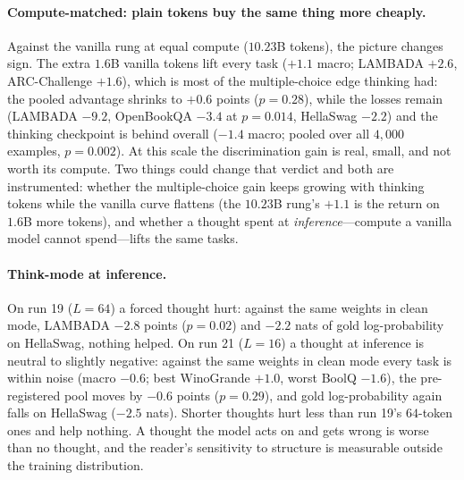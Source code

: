 \documentclass{article} %
\begin{document}
\paragraph{Compute-matched: plain tokens buy the same thing more cheaply.} Against the vanilla rung at equal compute ($10.23$B tokens), the picture changes sign. The extra $1.6$B vanilla tokens lift every task ($+1.1$ macro; LAMBADA $+2.6$, ARC-Challenge $+1.6$), which is most of the multiple-choice edge thinking had: the pooled advantage shrinks to $+0.6$ points ($p = 0.28$), while the losses remain (LAMBADA $-9.2$, OpenBookQA $-3.4$ at $p = 0.014$, HellaSwag $-2.2$) and the thinking checkpoint is behind overall ($-1.4$ macro; pooled over all $4{,}000$ examples, $p = 0.002$). At this scale the discrimination gain is real, small, and not worth its compute. Two things could change that verdict and both are instrumented: whether the multiple-choice gain keeps growing with thinking tokens while the vanilla curve flattens (the $10.23$B rung's $+1.1$ is the return on $1.6$B more tokens), and whether a thought spent at \emph{inference}---compute a vanilla model cannot spend---lifts the same tasks.

\paragraph{Think-mode at inference.} On run 19 ($L{=}64$) a forced thought hurt: against the same weights in clean mode, LAMBADA $-2.8$ points ($p = 0.02$) and $-2.2$ nats of gold log-probability on HellaSwag, nothing helped. On run 21 ($L{=}16$) a thought at inference is neutral to slightly negative: against the same weights in clean mode every task is within noise (macro $-0.6$; best WinoGrande $+1.0$, worst BoolQ $-1.6$), the pre-registered pool moves by $-0.6$ points ($p = 0.29$), and gold log-probability again falls on HellaSwag ($-2.5$ nats). Shorter thoughts hurt less than run 19's $64$-token ones and help nothing. A thought the model acts on and gets wrong is worse than no thought, and the reader's sensitivity to structure is measurable outside the training distribution.
\end{document}
